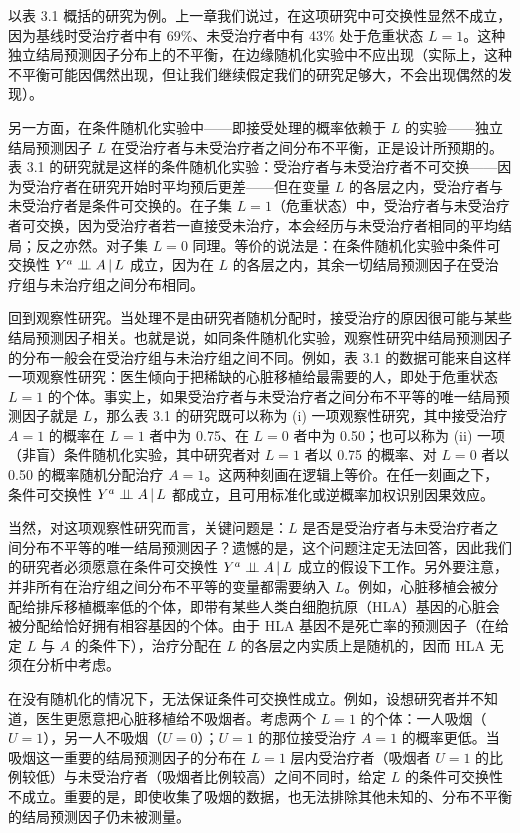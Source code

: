 以表 3.1 概括的研究为例。上一章我们说过，在这项研究中可交换性显然不成立，因为基线时受治疗者中有 69\%、未受治疗者中有 43\% 处于危重状态 $L=1$。这种独立结局预测因子分布上的不平衡，在边缘随机化实验中不应出现（实际上，这种不平衡可能因偶然出现，但让我们继续假定我们的研究足够大，不会出现偶然的发现）。

另一方面，在条件随机化实验中——即接受处理的概率依赖于 $L$ 的实验——独立结局预测因子 $L$ 在受治疗者与未受治疗者之间分布不平衡，正是设计所预期的。表 3.1 的研究就是这样的条件随机化实验：受治疗者与未受治疗者不可交换——因为受治疗者在研究开始时平均预后更差——但在变量 $L$ 的各层之内，受治疗者与未受治疗者是条件可交换的。在子集 $L=1$（危重状态）中，受治疗者与未受治疗者可交换，因为受治疗者若一直接受未治疗，本会经历与未受治疗者相同的平均结局；反之亦然。对子集 $L=0$ 同理。等价的说法是：在条件随机化实验中条件可交换性 $Y^{a}\perp\!\!\!\perp A\,|\, L$ 成立，因为在 $L$ 的各层之内，其余一切结局预测因子在受治疗组与未治疗组之间分布相同。

回到观察性研究。当处理不是由研究者随机分配时，接受治疗的原因很可能与某些结局预测因子相关。也就是说，如同条件随机化实验，观察性研究中结局预测因子的分布一般会在受治疗组与未治疗组之间不同。例如，表 3.1 的数据可能来自这样一项观察性研究：医生倾向于把稀缺的心脏移植给最需要的人，即处于危重状态 $L=1$ 的个体。事实上，如果受治疗者与未受治疗者之间分布不平等的唯一结局预测因子就是 $L$，那么表 3.1 的研究既可以称为 (i) 一项观察性研究，其中接受治疗 $A=1$ 的概率在 $L=1$ 者中为 0.75、在 $L=0$ 者中为 0.50；也可以称为 (ii) 一项（非盲）条件随机化实验，其中研究者对 $L=1$ 者以 0.75 的概率、对 $L=0$ 者以 0.50 的概率随机分配治疗 $A=1$。这两种刻画在逻辑上等价。在任一刻画之下，条件可交换性 $Y^{a}\perp\!\!\!\perp A\,|\, L$ 都成立，且可用标准化或逆概率加权识别因果效应。


当然，对这项观察性研究而言，关键问题是：$L$ 是否是受治疗者与未受治疗者之间分布不平等的唯一结局预测因子？遗憾的是，这个问题注定无法回答，因此我们的研究者必须愿意在条件可交换性 $Y^{a}\perp\!\!\!\perp A\,|\, L$ 成立的假设下工作。另外要注意，并非所有在治疗组之间分布不平等的变量都需要纳入 $L$。例如，心脏移植会被分配给排斥移植概率低的个体，即带有某些人类白细胞抗原（HLA）基因的心脏会被分配给恰好拥有相容基因的个体。由于 HLA 基因不是死亡率的预测因子（在给定 $L$ 与 $A$ 的条件下），治疗分配在 $L$ 的各层之内实质上是随机的，因而 HLA 无须在分析中考虑。

在没有随机化的情况下，无法保证条件可交换性成立。例如，设想研究者并不知道，医生更愿意把心脏移植给不吸烟者。考虑两个 $L=1$ 的个体：一人吸烟（$U=1$），另一人不吸烟（$U=0$）；$U=1$ 的那位接受治疗 $A=1$ 的概率更低。当吸烟这一重要的结局预测因子的分布在 $L=1$ 层内受治疗者（吸烟者 $U=1$ 的比例较低）与未受治疗者（吸烟者比例较高）之间不同时，给定 $L$ 的条件可交换性不成立。重要的是，即使收集了吸烟的数据，也无法排除其他未知的、分布不平衡的结局预测因子仍未被测量。

